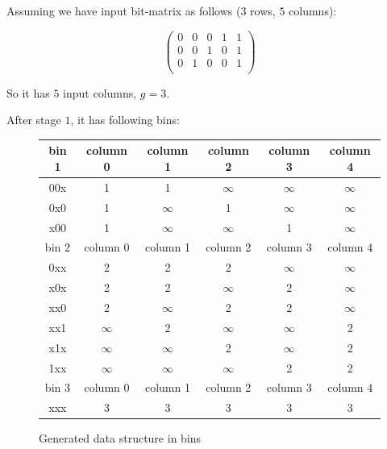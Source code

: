 
Assuming we have input bit-matrix as follows ($3$ rows, $5$ columns):

\[ 
\begin{pmatrix} 
0 & 0 & 0 & 1 & 1 \\
0 & 0 & 1 & 0 & 1 \\
0 & 1 & 0 & 0 & 1 \\
\end{pmatrix}
\]

So it has $5$ input columns, $g = 3$.

After stage $1$, it has following bins:

\begin{figure}[!h]
\begin{minipage}[b]{0.5\linewidth}
\centering
\begin{tabular}{|c|ccccc|}
\hline
bin 1 & column 0 & column 1 & column 2 & column 3 & column 4 \\
\hline
00x & 1 & 1 & $\infty$ & $\infty$ & $\infty$ \\
0x0 & 1 & $\infty$ & 1 & $\infty$ & $\infty$ \\
x00 & 1 & $\infty$ & $\infty$ & 1 & $\infty$ \\
\hline
bin 2 & column 0 & column 1 & column 2 & column 3 & column 4 \\
\hline
0xx & 2 & 2 & 2 & $\infty$ & $\infty$ \\
x0x & 2 & 2 & $\infty$ & 2 & $\infty$ \\
xx0 & 2 & $\infty$ & 2 & 2 & $\infty$ \\
xx1 & $\infty$ & 2 & $\infty$ & $\infty$ & 2 \\
x1x & $\infty$ & $\infty$ & 2 & $\infty$ & 2 \\
1xx & $\infty$ & $\infty$ & $\infty$ & 2 & 2 \\
\hline
bin 3 & column 0 & column 1 & column 2 & column 3 & column 4 \\
\hline
xxx & 3 & 3 & 3 & 3 & 3 \\
\hline
\end{tabular}
\caption{Generated data structure in bins}
\label{fig:bin}
\end{minipage}
\hspace{0.2cm}
\begin{minipage}[b]{0.5\linewidth}
\centering

\end{minipage}
\end{figure}
